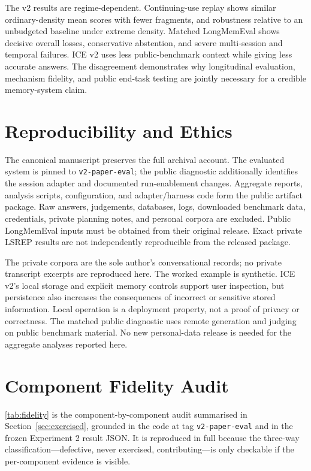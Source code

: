 \documentclass[11pt,a4paper]{article}
\begin{document}
The v2 results are regime-dependent. Continuing-use replay shows similar ordinary-density mean scores with fewer fragments, and robustness relative to an unbudgeted baseline under extreme density. Matched LongMemEval shows decisive overall losses, conservative abstention, and severe multi-session and temporal failures. ICE v2 uses less public-benchmark context while giving less accurate answers. The disagreement demonstrates why longitudinal evaluation, mechanism fidelity, and public end-task testing are jointly necessary for a credible memory-system claim.

\section*{Reproducibility and Ethics}
\label{sec:repro}
The canonical manuscript preserves the full archival account. The evaluated system is pinned to \texttt{v2-paper-eval}; the public diagnostic additionally identifies the session adapter and documented run-enablement changes. Aggregate reports, analysis scripts, configuration, and adapter/harness code form the public artifact package. Raw answers, judgements, databases, logs, downloaded benchmark data, credentials, private planning notes, and personal corpora are excluded. Public LongMemEval inputs must be obtained from their original release. Exact private LSREP results are not independently reproducible from the released package.

The private corpora are the sole author's conversational records; no private transcript excerpts are reproduced here. The worked example is synthetic. ICE v2's local storage and explicit memory controls support user inspection, but persistence also increases the consequences of incorrect or sensitive stored information. Local operation is a deployment property, not a proof of privacy or correctness. The matched public diagnostic uses remote generation and judging on public benchmark material. No new personal-data release is needed for the aggregate analyses reported here.





\appendix

\FloatBarrier
\section{Component Fidelity Audit}
\label{app:fidelity}

\cref{tab:fidelity} is the component-by-component audit summarised in Section~\ref{sec:exercised}, grounded in the code at tag \texttt{v2-paper-eval} and in the frozen Experiment 2 result JSON. It is reproduced in full because the three-way classification---defective, never exercised, contributing---is only checkable if the per-component evidence is visible.
\end{document}
